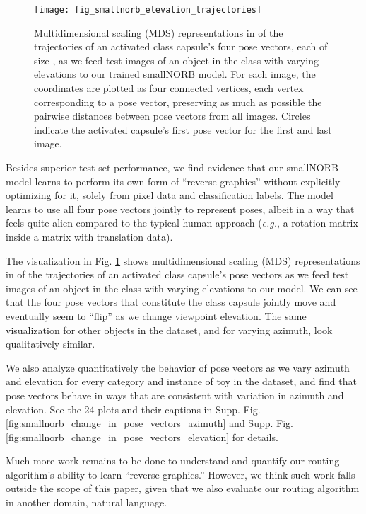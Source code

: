 \documentclass[11pt,a4paper]{article}
\begin{document}
\begin{figure}[h]
	\vskip 0.1in
	\begin{center}
		\centerline{\texttt{[image: fig\_smallnorb\_elevation\_trajectories]}}
		\caption{Multidimensional scaling (MDS) representations in  of the trajectories of an activated class capsule's four pose vectors, each of size , as we feed test images of an object in the class with varying elevations to our trained smallNORB model. For each image, the  coordinates are plotted as four connected vertices, each vertex corresponding to a pose vector, preserving as much as possible the pairwise distances between pose vectors from all images. Circles indicate the activated capsule's first pose vector for the first and last image.}
		\label{fig:smallnorb_elevation_trajectories}
	\end{center}
	\vskip -0.2in
\end{figure}

Besides superior test set performance, we find evidence that our smallNORB model learns to perform its own form of ``reverse graphics'' without explicitly optimizing for it, solely from pixel data and classification labels. The model learns to use all four pose vectors jointly to represent poses, albeit in a way that feels quite alien compared to the typical human approach ({\em e.g.}, a  rotation matrix inside a  matrix with translation data).

The visualization in Fig. \ref{fig:smallnorb_elevation_trajectories} shows multidimensional scaling (MDS) representations in  of the trajectories of an activated class capsule's pose vectors as we feed test images of an object in the class with varying elevations to our model. We can see that the four pose vectors that constitute the class capsule jointly move and eventually seem to ``flip'' as we change viewpoint elevation. The same visualization for other objects in the dataset, and for varying azimuth, look qualitatively similar.

We also analyze quantitatively the behavior of pose vectors as we vary azimuth and elevation for every category and instance of toy in the dataset, and find that pose vectors behave in ways that are consistent with variation in azimuth and elevation. See the 24 plots and their captions in Supp. Fig. \ref{fig:smallnorb_change_in_pose_vectors_azimuth} and Supp. Fig. \ref{fig:smallnorb_change_in_pose_vectors_elevation} for details.

Much more work remains to be done to understand and quantify our routing algorithm's ability to learn ``reverse graphics.'' However, we think such work falls outside the scope of this paper, given that we also evaluate our routing algorithm in another domain, natural language.
\end{document}
